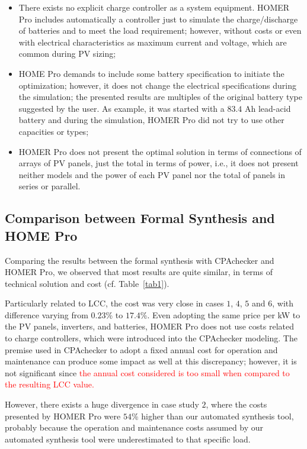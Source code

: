 \documentclass[review]{elsarticle}
\begin{document}
\begin{itemize}
\item There exists no explicit charge controller 
as a system equipment. HOMER Pro includes automatically 
a controller just to simulate the charge/discharge 
of batteries and to meet the load requirement; however, 
without costs or even with electrical characteristics 
as maximum current and voltage, which are common during PV sizing;
\item HOME Pro demands to include some battery specification 
to initiate the optimization; however, it does not change 
the electrical specifications during the simulation; 
the presented results are multiples of the original 
battery type suggested by the user. As example, it was 
started with a $83.4$ Ah lead-acid battery and during 
the simulation, HOMER Pro did not try to use other capacities or types;
\item HOMER Pro does not present the optimal solution 
in terms of connections of arrays of PV panels, just the 
total in terms of power, i.e., it does not present neither models 
and the power of each PV panel nor the total of panels in series or parallel. 
\end{itemize}

\subsection{Comparison between Formal Synthesis and HOME Pro}

Comparing the results between the formal synthesis with CPAchecker 
and HOMER Pro, we observed that most results are quite similar, 
in terms of technical solution and cost (cf. Table~\ref{tab1}). 

Particularly related to LCC, the cost was very close in cases 
$1$, $4$, $5$ and $6$, with difference varying from $0.23$\% to $17.4$\%. 
Even adopting the same price per kW to the PV panels, 
inverters, and batteries, HOMER Pro does not use costs 
related to charge controllers, which were introduced into the 
CPAchecker modeling. The premise used in CPAchecker to adopt 
a fixed annual cost for operation and maintenance can produce 
some impact as well at this discrepancy; however, it is not significant
since \textcolor{red}{the annual cost considered is too small when compared to the resulting LCC value.}

However, there exists a huge divergence in case study $2$, 
where the costs presented by HOMER Pro were $54$\% higher 
than our automated synthesis tool, probably because the 
operation and maintenance costs assumed by our automated 
synthesis tool were underestimated to that specific load. 
\end{document}
